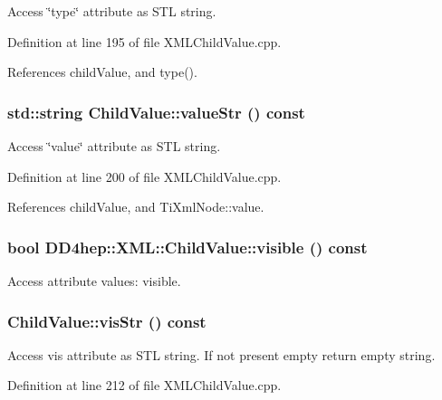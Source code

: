Access \char`\"{}type\char`\"{} attribute as STL string. 

Definition at line 195 of file XMLChildValue.cpp.

References childValue, and type().\hypertarget{struct_d_d4hep_1_1_x_m_l_1_1_child_value_ab97b87abcbe2f6d3857b0ef2de082193}{
\subsubsection[{valueStr}]{\setlength{\rightskip}{0pt plus 5cm}std::string ChildValue::valueStr () const}}
\label{struct_d_d4hep_1_1_x_m_l_1_1_child_value_ab97b87abcbe2f6d3857b0ef2de082193}


Access \char`\"{}value\char`\"{} attribute as STL string. 

Definition at line 200 of file XMLChildValue.cpp.

References childValue, and TiXmlNode::value.\hypertarget{struct_d_d4hep_1_1_x_m_l_1_1_child_value_a3bebeae6e105f3dfd8e378aaaec5d6eb}{
\subsubsection[{visible}]{\setlength{\rightskip}{0pt plus 5cm}bool DD4hep::XML::ChildValue::visible () const}}
\label{struct_d_d4hep_1_1_x_m_l_1_1_child_value_a3bebeae6e105f3dfd8e378aaaec5d6eb}


Access attribute values: visible. \hypertarget{struct_d_d4hep_1_1_x_m_l_1_1_child_value_a2df3ef6ebddc522172e9397cf4459a3d}{
\subsubsection[{visStr}]{ ChildValue::visStr () const}}
\label{struct_d_d4hep_1_1_x_m_l_1_1_child_value_a2df3ef6ebddc522172e9397cf4459a3d}


Access vis attribute as STL string. If not present empty return empty string. 

Definition at line 212 of file XMLChildValue.cpp.

